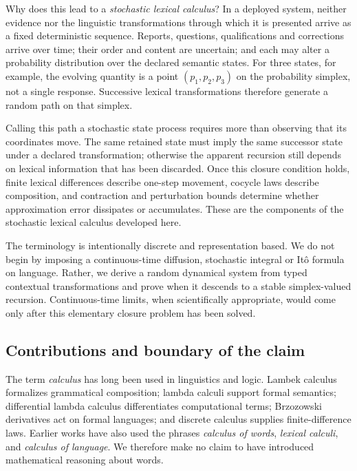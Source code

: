 \documentclass[11pt]{article}
\begin{document}
Why does this lead to a \emph{stochastic lexical calculus}?  In a deployed
system, neither evidence nor the linguistic transformations through which it
is presented arrive as a fixed deterministic sequence.  Reports, questions,
qualifications and corrections arrive over time; their order and content are
uncertain; and each may alter a probability distribution over the declared
semantic states.  For three states, for example, the evolving quantity is a
point $(p_1,p_2,p_3)$ on the probability simplex, not a single response.
Successive lexical transformations therefore generate a random path on that
simplex.

Calling this path a stochastic state process requires more than observing
that its coordinates move.  The same retained state must imply the same
successor state under a declared transformation; otherwise the apparent
recursion still depends on lexical information that has been discarded.  Once
this closure condition holds, finite lexical differences describe one-step
movement, cocycle laws describe composition, and contraction and perturbation
bounds determine whether approximation error dissipates or accumulates.
These are the components of the stochastic lexical calculus developed here.

The terminology is intentionally discrete and representation based.  We do
not begin by imposing a continuous-time diffusion, stochastic integral or
It\^o formula on language.  Rather, we derive a random dynamical system from
typed contextual transformations and prove when it descends to a stable
simplex-valued recursion.  Continuous-time limits, when scientifically
appropriate, would come only after this elementary closure problem has been
solved.

\subsection{Contributions and boundary of the claim}

The term \emph{calculus} has long been used in linguistics and logic. Lambek calculus formalizes grammatical composition; lambda calculi support formal semantics; differential lambda calculus differentiates computational terms; Brzozowski derivatives act on formal languages; and discrete calculus supplies finite-difference laws. Earlier works have also used the phrases \emph{calculus of words}, \emph{lexical calculi}, and \emph{calculus of language}. We therefore make no claim to have introduced mathematical reasoning about words.
\end{document}
